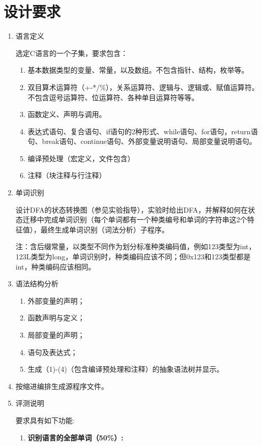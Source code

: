 \documentclass{ctexrep}
\begin{document}
\section*{设计要求}
\begin{enumerate}
    \item 语言定义
    
    选定C语言的一个子集，要求包含：

    \begin{enumerate}[label={(\arabic*)}]
        \item 基本数据类型的变量、常量，以及数组。不包含指针、结构，枚举等。
        \item 双目算术运算符（+\;-\;*\;/\;\%），关系运算符、逻辑与、逻辑或、赋值运算符。不包含逗号运算符、位运算符、各种单目运算符等等。
        \item 函数定义、声明与调用。
        \item 表达式语句、复合语句、if语句的2种形式、while语句、for语句，return语句、break语句、continue语句、外部变量说明语句、局部变量说明语句。
        \item 编译预处理（宏定义，文件包含）
        \item 注释（块注释与行注释）
    \end{enumerate}
    \item 单词识别
    
    设计DFA的状态转换图（参见实验指导），实验时给出DFA，并解释如何在状态迁移中完成单词识别（每个单词都有一个种类编号和单词的字符串这2个特征值），最终生成单词识别（词法分析）子程序。

    注：含后缀常量，以类型不同作为划分标准种类编码值，例如123类型为int，123L类型为long，单词识别时，种类编码应该不同；但0x123和123类型都是int，种类编码应该相同。
    \item 语法结构分析
    \begin{enumerate}[label={(\arabic*)}]
        \item 外部变量的声明；
        \item 函数声明与定义；
        \item 局部变量的声明；
        \item 语句及表达式；
        \item 生成（1)-(4)（包含编译预处理和注释）的抽象语法树并显示。
    \end{enumerate}
    \item 按缩进编排生成源程序文件。
    \item 评测说明
 
    要求具有如下功能:
    \begin{enumerate}[label={(\arabic*)}]
        \item \textbf{识别语言的全部单词（50\%）:}
        

\end{enumerate}
\end{enumerate}
\end{document}
